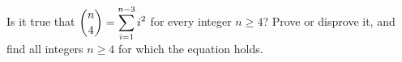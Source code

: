 Is it true that $\dbinom n4=\displaystyle\sum_{i=1}^{n-3}i^2$ for every integer $n\ge4$? Prove or disprove it, and find all integers $n\ge4$ for which the equation holds.
